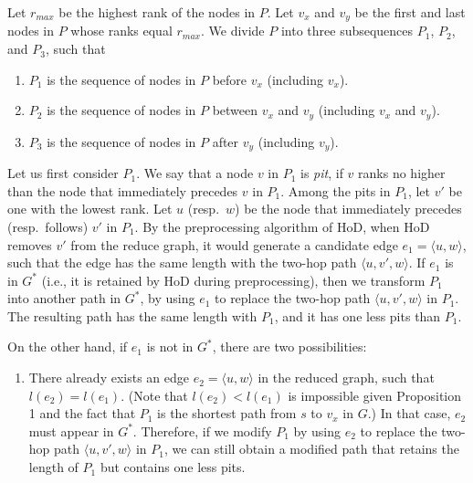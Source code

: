\documentclass{sig-alternate}
\def\G{G^*}
\begin{document}
\begin{sloppy}
Let $r_{max}$ be the highest rank of the nodes in $P$. Let $v_x$ and $v_y$ be the first and last nodes in $P$ whose ranks equal $r_{max}$. We divide $P$ into three subsequences $P_1$, $P_2$, and $P_3$, such that
\begin{enumerate}
\item $P_1$ is the sequence of nodes in $P$ before $v_x$ (including $v_x$).
\item $P_2$ is the sequence of nodes in $P$ between $v_x$ and $v_y$ (including $v_x$ and $v_y$).
\item $P_3$ is the sequence of nodes in $P$ after $v_y$ (including $v_y$).
\end{enumerate}

Let us first consider $P_1$. We say that a node $v$ in $P_1$ is {\em pit}, if $v$ ranks no higher than the node that immediately precedes $v$ in $P_1$. Among the pits in $P_1$, let $v'$ be one with the lowest rank. Let $u$ (resp.\ $w$) be the node that immediately precedes (resp.\ follows) $v'$ in $P_1$. By the preprocessing algorithm of HoD, when HoD removes $v'$ from the reduce graph, it would generate a candidate edge $e_1 = \langle u, w\rangle$, such that the edge has the same length with the two-hop path $\langle u, v', w\rangle$. If $e_1$ is in $\G$ (i.e., it is retained by HoD during preprocessing), then we transform $P_1$ into another path in $\G$, by using $e_1$ to replace the two-hop path $\langle u, v', w\rangle$ in $P_1$. The resulting path has the same length with $P_1$, and it has one less pits than $P_1$. 

On the other hand, if $e_1$ is not in $\G$, there are two possibilities:
\begin{enumerate} 
\item There already exists an edge $e_2 = \langle u, w\rangle$ in the reduced graph, such that $l(e_2) = l(e_1)$. (Note that $l(e_2) < l(e_1)$ is impossible given Proposition 1 and the fact that $P_1$ is the shortest path from $s$ to $v_x$ in $G$.) In that case, $e_2$ must appear in $\G$. Therefore, if we modify $P_1$ by using $e_2$ to replace the two-hop path $\langle u, v', w\rangle$ in $P_1$, we can still obtain a modified path that retains the length of $P_1$ but contains one less pits.
    

\end{enumerate}
\end{sloppy}
\end{document}
